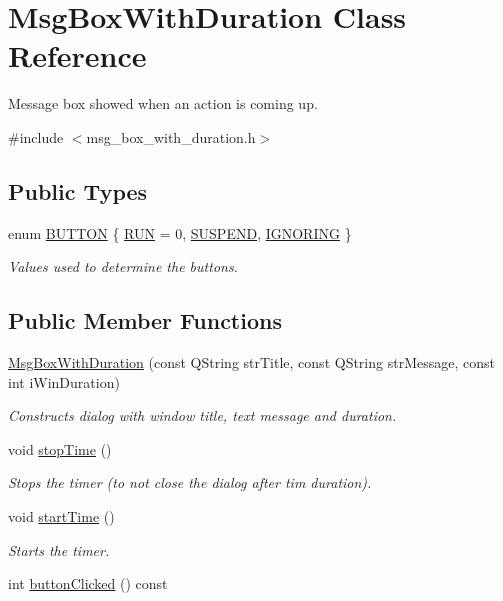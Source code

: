 \hypertarget{class_msg_box_with_duration}{\section{Msg\-Box\-With\-Duration Class Reference}
\label{class_msg_box_with_duration}
}


Message box showed when an action is coming up.  




{\ttfamily \#include $<$msg\-\_\-box\-\_\-with\-\_\-duration.\-h$>$}

\subsection*{Public Types}
\begin{DoxyCompactItemize}
\item 
enum \hyperlink{class_msg_box_with_duration_a073eed452996a098c2cc5c6e8c4b2d41}{B\-U\-T\-T\-O\-N} \{ \hyperlink{class_msg_box_with_duration_a073eed452996a098c2cc5c6e8c4b2d41acb8045d345b814e888163b1786bfc298}{R\-U\-N} =  0, 
\hyperlink{class_msg_box_with_duration_a073eed452996a098c2cc5c6e8c4b2d41a06af0f7bc66bc90b7ff3c4487a82b743}{S\-U\-S\-P\-E\-N\-D}, 
\hyperlink{class_msg_box_with_duration_a073eed452996a098c2cc5c6e8c4b2d41a655fd2c0a110ea9cfe8179a001c58bac}{I\-G\-N\-O\-R\-I\-N\-G}
 \}
\begin{DoxyCompactList}\small\item\em Values used to determine the buttons. \end{DoxyCompactList}\end{DoxyCompactItemize}
\subsection*{Public Member Functions}
\begin{DoxyCompactItemize}
\item 
\hyperlink{class_msg_box_with_duration_a7713b19e8ba864a95a602e12e05ac95c}{Msg\-Box\-With\-Duration} (const Q\-String str\-Title, const Q\-String str\-Message, const int i\-Win\-Duration)
\begin{DoxyCompactList}\small\item\em Constructs dialog with window title, text message and duration. \end{DoxyCompactList}\item 
void \hyperlink{class_msg_box_with_duration_abf5fd8cee554972bbd35176082e7aab8}{stop\-Time} ()
\begin{DoxyCompactList}\small\item\em Stops the timer (to not close the dialog after tim duration). \end{DoxyCompactList}\item 
void \hyperlink{class_msg_box_with_duration_af956a669bce59736d9c5a3d4301fcf77}{start\-Time} ()
\begin{DoxyCompactList}\small\item\em Starts the timer. \end{DoxyCompactList}\item 
int \hyperlink{class_msg_box_with_duration_acb6071e4bd54ec3f6280cc0c469317a5}{button\-Clicked} () const 
\end{DoxyCompactItemize}
